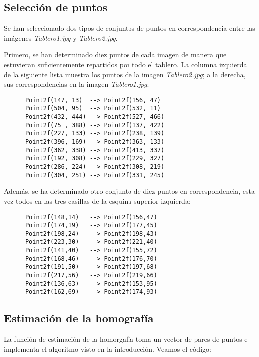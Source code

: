 \documentclass[a4paper, 11pt]{article}
\theoremstyle{definition}
\theoremstyle{theorem}
\begin{document}
  \subsection{Selección de puntos}
  Se han seleccionado dos tipos de conjuntos de puntos en correspondencia entre las imágenes \emph{Tablero1.jpg} y \emph{Tablero2.jpg}.

  Primero, se han determinado diez puntos de cada imagen de manera que estuvieran suficientemente repartidos por todo el tablero. La columna izquierda de la siguiente lista muestra los puntos de la imagen \emph{Tablero2.jpg}; a la derecha, sus correspondencias en la imagen \emph{Tablero1.jpg}:
  \begin{lstlisting}
      Point2f(147, 13)  --> Point2f(156, 47)
      Point2f(504, 95)  --> Point2f(532, 11)
      Point2f(432, 444) --> Point2f(527, 466)
      Point2f(75 , 388) --> Point2f(137, 422)
      Point2f(227, 133) --> Point2f(238, 139)
      Point2f(396, 169) --> Point2f(363, 133)
      Point2f(362, 338) --> Point2f(413, 337)
      Point2f(192, 308) --> Point2f(229, 327)
      Point2f(286, 224) --> Point2f(308, 219)
      Point2f(304, 251) --> Point2f(331, 245)
  \end{lstlisting}

  Además, se ha determinado otro conjunto de diez puntos en correspondencia, esta vez todos en las tres casillas de la esquina superior izquierda:
  \begin{lstlisting}
      Point2f(148,14)   --> Point2f(156,47)
      Point2f(174,19)   --> Point2f(177,45)
      Point2f(198,24)   --> Point2f(198,43)
      Point2f(223,30)   --> Point2f(221,40)
      Point2f(141,40)   --> Point2f(155,72)
      Point2f(168,46)   --> Point2f(176,70)
      Point2f(191,50)   --> Point2f(197,68)
      Point2f(217,56)   --> Point2f(219,66)
      Point2f(136,63)   --> Point2f(153,95)
      Point2f(162,69)   --> Point2f(174,93)
  \end{lstlisting}

  \subsection{Estimación de la homografía}
  La función de estimación de la homorgafía toma un vector de pares de puntos e implementa el algoritmo visto en la introducción. Veamos el código:
\end{document}
